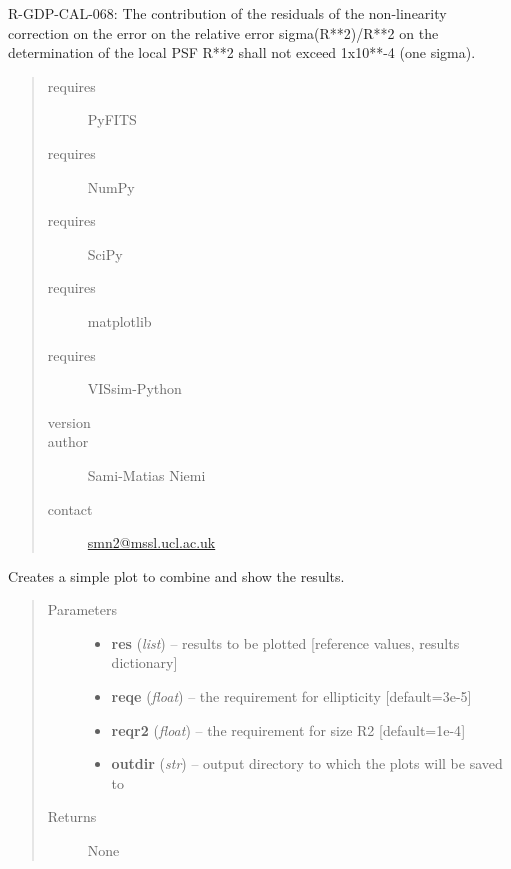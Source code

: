 \documentclass[a4paper,11pt,english]{sphinxmanual}
\begin{document}
R-GDP-CAL-068: The contribution of the residuals of the non-linearity correction on the error on the relative
error sigma(R**2)/R**2 on the determination of the local PSF R**2 shall not exceed 1x10**-4 (one sigma).
\begin{quote}\begin{description}
\item[{requires}] \leavevmode
PyFITS

\item[{requires}] \leavevmode
NumPy

\item[{requires}] \leavevmode
SciPy

\item[{requires}] \leavevmode
matplotlib

\item[{requires}] \leavevmode
VISsim-Python

\item[{version}] 

\item[{author}] \leavevmode
Sami-Matias Niemi

\item[{contact}] \leavevmode
\href{mailto:smn2@mssl.ucl.ac.uk}{smn2@mssl.ucl.ac.uk}

\end{description}\end{quote}

\begin{fulllineitems}
\label{reduction:analysis.nonlinearityCalibration.plotResults}
Creates a simple plot to combine and show the results.
\begin{quote}\begin{description}
\item[{Parameters}] \leavevmode\begin{itemize}
\item {} 
\textbf{res} (\emph{list}) -- results to be plotted {[}reference values, results dictionary{]}

\item {} 
\textbf{reqe} (\emph{float}) -- the requirement for ellipticity {[}default=3e-5{]}

\item {} 
\textbf{reqr2} (\emph{float}) -- the requirement for size R2 {[}default=1e-4{]}

\item {} 
\textbf{outdir} (\emph{str}) -- output directory to which the plots will be saved to

\end{itemize}

\item[{Returns}] \leavevmode
None

\end{description}\end{quote}

\end{fulllineitems}
\end{document}
